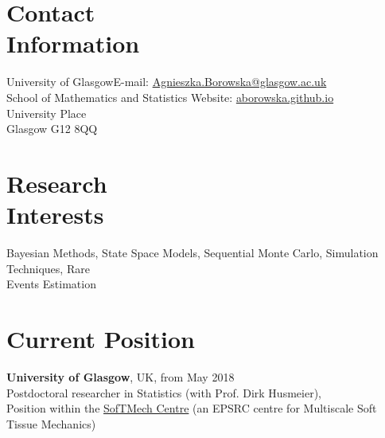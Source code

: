 \documentclass[margin,line]{resume}
\begin{document}
\begin{resume}
    \section{\mysidestyle Contact\\Information}
    University of Glasgow\hfill  E-mail: \url{Agnieszka.Borowska@glasgow.ac.uk} \\
    School of Mathematics and Statistics \hfill Website: \url{aborowska.github.io}\\ \vspace{0mm}%
    University Place \\
    Glasgow G12 8QQ\\ \vspace{-4.5mm}%
    \section{\mysidestyle Research\\Interests}
    
    Bayesian Methods, State Space Models, Sequential Monte Carlo, Simulation Techniques, Rare \\ Events Estimation

 
    \section{\mysidestyle Current Position}
    \textbf{University of Glasgow},  UK, \hfill from May 2018\\
	Postdoctoral researcher in Statistics (with Prof. Dirk Husmeier),\\ 
    Position within the \href{http://softmech.org/}{SofTMech Centre} (an EPSRC centre for Multiscale Soft Tissue Mechanics)

\vspace{-1mm}    

\end{resume}
\end{document}
